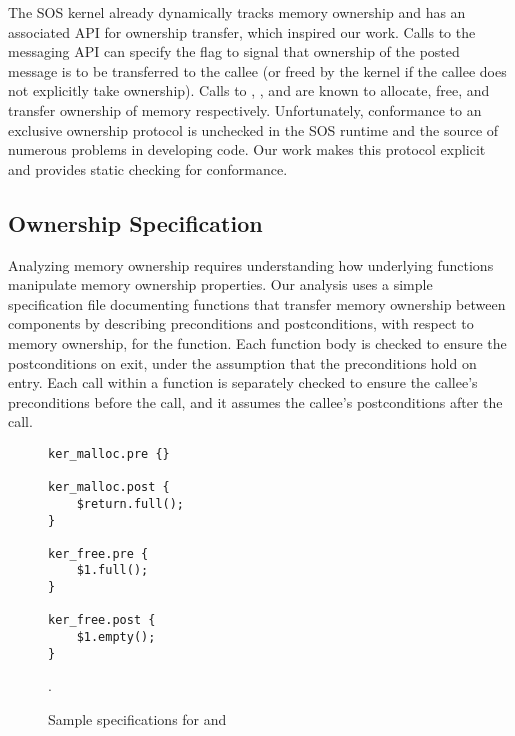 The SOS kernel already dynamically tracks memory ownership and has an
associated API for ownership transfer, which inspired our work.  
%
Calls to the messaging API can specify the  flag to
signal that ownership of the posted message is to be transferred to the callee
(or freed by the kernel if the callee does not explicitly take ownership).  
%
Calls to , , and 
are known to allocate, free, and transfer ownership of memory respectively.
%
Unfortunately, conformance to an exclusive ownership protocol is unchecked in
the SOS runtime and the source of numerous problems in developing code.
%
Our work makes this protocol explicit and provides static checking for
conformance.



\subsection{Ownership Specification}


%  
%  



Analyzing memory ownership requires understanding how underlying functions
manipulate memory ownership properties.
%
Our analysis uses a simple specification file documenting functions that
transfer memory ownership between components by describing preconditions and
postconditions, with respect to memory ownership, for the function.
%
Each function body is checked to ensure the postconditions on exit, under
the assumption that the preconditions hold on entry.  
%
Each call within a function is separately checked to ensure the callee's
preconditions before the call, and it assumes the callee's postconditions
after the call.



\begin{figure}[tp]
\begin{scriptsize}
\begin{verbatim}
ker_malloc.pre {}

ker_malloc.post {
    $return.full();
}

ker_free.pre {
    $1.full();
}

ker_free.post {
    $1.empty();
}
\end{verbatim}
\end{scriptsize}
\caption{\label{fig:spec}Sample specifications for  and
}.
\end{figure}



